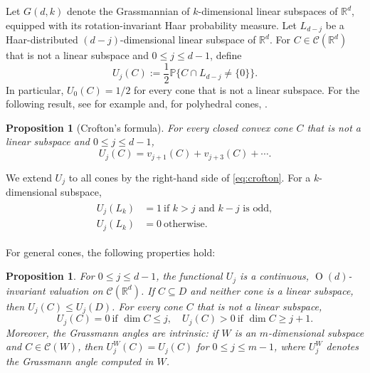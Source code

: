 \documentclass[11pt]{article}
\newcommand{\R}{\mathbb{R}}
\newcommand{\CC}{\mathcal{C}}
\newcommand{\On}[1]{\operatorname{O}(#1)}
\newcommand{\Prob}{\mathbb{P}}
\newcommand{\vct}[1]{#1}
\newcommand{\zero}{\vct{0}}
\theoremstyle{plain}
\newtheorem{proposition}[theorem]{Proposition}
\theoremstyle{definition}
\begin{document}
Let $G(d,k)$ denote the Grassmannian of $k$-dimensional linear subspaces
of $\R^d$, equipped with its rotation-invariant Haar probability measure.
Let $L_{d-j}$ be a Haar-distributed $(d-j)$-dimensional linear subspace of
$\R^d$.  For $C\in\CC(\R^d)$ that is not a linear subspace and
$0\le j\le d-1$, define
\begin{equation}\label{eq:grassmann-angle}
  U_j(C):=\frac12\Prob\{C\cap L_{d-j}\ne\{\zero\}\}.
\end{equation}
In particular, $U_0(C)=1/2$ for every cone that is not a linear subspace.
For the following result, see for example \cite[Theorem~4.3.5]{Sch22:Convex-Cones} and, for
polyhedral cones, \cite[Corollary~5.2]{AmelunxenLotz:Intrinsic-Volumes-Cones}.

\begin{proposition}[Crofton's formula]\label{prop:crofton}
For every closed convex cone $C$ that is not a linear subspace and
$0\le j\le d-1$,
\begin{equation}\label{eq:crofton}
  U_j(C)=v_{j+1}(C)+v_{j+3}(C)+\cdots.
\end{equation}
\end{proposition}

We extend $U_j$ to all cones by the right-hand side of
\eqref{eq:crofton}.  For a $k$-dimensional subspace,
\begin{align}\label{eq:grassmann-subspace}
  \begin{split}
  U_j(L_k)&=1  \ \text{if $k>j$ and $k-j$ is odd},\\
  U_j(L_k)&=0  \ \text{otherwise}.
\end{split}
\end{align}

For general cones, the following properties hold:

\begin{proposition}\label{prop:grassmann-facts}
For $0\le j\le d-1$, the functional $U_j$ is a continuous,
$\On d$-invariant valuation on $\CC(\R^d)$.  If $C\subseteq D$ and
neither cone is a linear subspace, then $U_j(C)\le U_j(D)$.
For every cone $C$ that is not a linear subspace,
\begin{equation}\label{eq:dimension-positive}
  U_j(C)=0 \ \text{if }\dim C\le j,\quad U_j(C)>0 \ \text{if }\dim C\ge j+1.
\end{equation}
Moreover, the Grassmann angles are intrinsic: if $W$ is an
$m$-dimensional subspace and $C\in\CC(W)$, then
$U_j^W(C)=U_j(C)$ for $0\le j\le m-1$, where $U_j^W$ denotes the
Grassmann angle computed in $W$.
\end{proposition}
\end{document}
